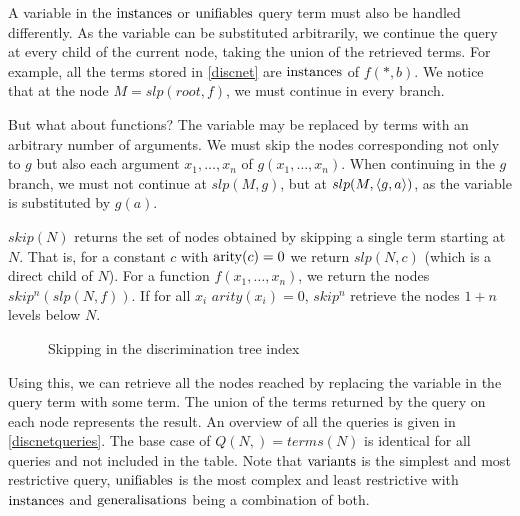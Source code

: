 A variable in the $\mathrm{instances}$ or $\mathrm{unifiables}$ query term must also be handled differently. As the variable can be substituted arbitrarily, we continue the query at every child of the current node, taking the union of the retrieved terms. For example, all the terms stored in \cref{discnet} are $\mathrm{instances}$ of $f(*,b)$. We notice that at the node $M = slp(root,f)$, we must continue in every branch.

But what about functions? The variable may be replaced by terms with an arbitrary number of arguments. We must skip the nodes corresponding not only to $g$ but also each argument $x_{1}, \dots, x_{n}$ of $g(x_{1},\dots,x_{n})$. When continuing in the $g$ branch, we must not continue at $slp(M,g)$, but at $slp(M,\langle g,a \rangle)$, as the variable is substituted by $g(a)$.

\begin{defn}
  $skip(N)$ returns the set of nodes obtained by skipping a single term starting at $N$. That is, for a constant $c$ with $\mathrm{arity}(c) = 0$ we return $slp(N,c)$ (which is a direct child of $N$). For a function $f(x_{1},\dots,x_{n})$, we return the nodes $skip^n(slp(N,f))$. If for all $x_{i}$ $arity(x_{i}) = 0$, $skip^n$ retrieve the nodes $1 + n$ levels below $N$.
\end{defn}

\begin{figure}[h]
  \centering
{}
  \caption{Skipping in the discrimination tree index} \label{discnetskip}
\end{figure}


Using this, we can retrieve all the nodes reached by replacing the variable in the query term with some term. The union of the terms returned by the query on each node represents the result. An overview of all the queries is given in \cref{discnetqueries}. The base case of $Q(N,\ang{}) = terms(N)$ is identical for all queries and not included in the table. Note that $\mathrm{variants}$ is the simplest and most restrictive query, $\mathrm{unifiables}$ is the most complex and least restrictive with $\mathrm{instances}$ and $\mathrm{generalisations}$ being a combination of both.

